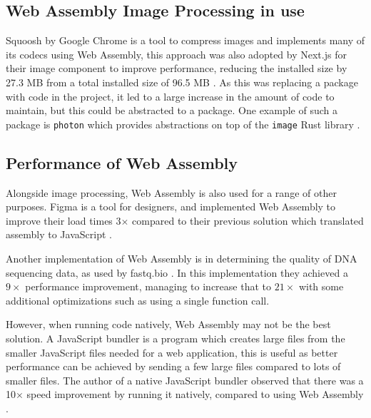 \documentclass[12pt,a4paper]{article}
\begin{document}
\subsection{Web Assembly Image Processing in use}

Squoosh by Google Chrome is a tool to compress images and implements many of its codecs using Web Assembly, this approach was also adopted by Next.js for their image component to improve performance, reducing the installed size by 27.3 MB from a total installed size of 96.5 MB \cite{nextjs}. As this was replacing a package with code in the project, it led to a large increase in the amount of code to maintain, but this could be abstracted to a package. One example of such a package is \texttt{photon} which provides abstractions on top of the \texttt{image} Rust library \cite{photon}.




\subsection{Performance of Web Assembly}

Alongside image processing, Web Assembly is also used for a range of other purposes. Figma is a tool for designers, and implemented Web Assembly to improve their load times 3$\times$ compared to their previous solution which translated assembly to JavaScript \cite{figmawasm}.

Another implementation of Web Assembly is in determining the quality of DNA sequencing data, as used by fastq.bio \cite{fastq}. In this implementation they achieved a $9\times $ performance improvement, managing to increase that to $21 \times$ with some additional optimizations such as using a single function call.


However, when running code natively, Web Assembly may not be the best solution. A JavaScript bundler is a program which creates large files from the smaller JavaScript files needed for a web application, this is useful as better performance can be achieved by sending a few large files compared to lots of smaller files. The author of a native JavaScript bundler observed that there was a 10$\times$ speed improvement by running it natively, compared to using Web Assembly \cite{esbuild}.
\end{document}
